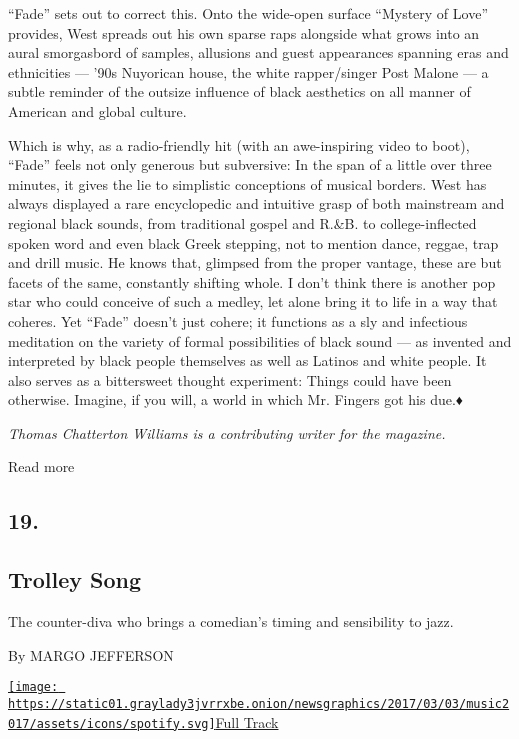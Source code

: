 ``Fade'' sets out to correct this. Onto the wide-open surface ``Mystery
of Love'' provides, West spreads out his own sparse raps alongside what
grows into an aural smorgasbord of samples, allusions and guest
appearances spanning eras and ethnicities --- '90s Nuyorican house, the
white rapper/singer Post Malone --- a subtle reminder of the outsize
influence of black aesthetics on all manner of American and global
culture.

Which is why, as a radio-friendly hit (with an awe-inspiring video to
boot), ``Fade'' feels not only generous but subversive: In the span of a
little over three minutes, it gives the lie to simplistic conceptions of
musical borders. West has always displayed a rare encyclopedic and
intuitive grasp of both mainstream and regional black sounds, from
traditional gospel and R.\&B. to college-inflected spoken word and even
black Greek stepping, not to mention dance, reggae, trap and drill
music. He knows that, glimpsed from the proper vantage, these are but
facets of the same, constantly shifting whole. I don't think there is
another pop star who could conceive of such a medley, let alone bring it
to life in a way that coheres. Yet ``Fade'' doesn't just cohere; it
functions as a sly and infectious meditation on the variety of formal
possibilities of black sound --- as invented and interpreted by black
people themselves as well as Latinos and white people. It also serves as
a bittersweet thought experiment: Things could have been otherwise.
Imagine, if you will, a world in which Mr. Fingers got his due.♦

\emph{Thomas Chatterton Williams is a contributing writer for the
magazine.}

Read more

\hypertarget{19}{%
\subsection{19.}\label{19}}

\hypertarget{--trolley-song}{%
\subsection{\texorpdfstring{ Trolley
Song}{  Trolley Song}}\label{--trolley-song}}

The counter-diva who brings a comedian's timing and sensibility to jazz.

By MARGO JEFFERSON

\href{https://open.spotify.com/track/5j78Obp9QYGopCUlsDd3nQ}{\texttt{[image: https://static01.graylady3jvrrxbe.onion/newsgraphics/2017/03/03/music2017/assets/icons/spotify.svg]}Full
Track}

